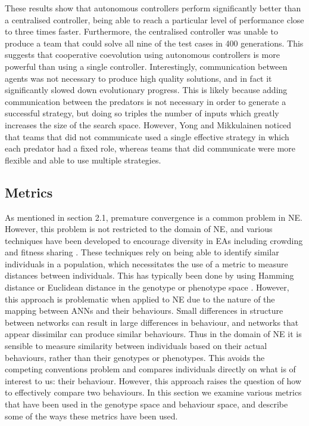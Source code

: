 \documentclass[12pt]{article} %
\begin{document}
These results show that autonomous controllers perform significantly better than a centralised controller, being able to reach a particular level of performance close to three times faster. Furthermore, the centralised controller was unable to produce a team that could solve all nine of the test cases in 400 generations. This suggests that cooperative coevolution using autonomous controllers is more powerful than using a single controller. Interestingly, communication between agents was not necessary to produce high quality solutions, and in fact it significantly slowed down evolutionary progress. This is likely because adding communication between the predators is not necessary in order to generate a successful strategy, but doing so triples the number of inputs which greatly increases the size of the search space. However, Yong and Mikkulainen noticed that teams that did not communicate used a single effective strategy in which each predator had a fixed role, whereas teams that did communicate were more flexible and able to use multiple strategies.

\subsection{Metrics}

As mentioned in section 2.1, premature convergence is a common problem in NE. However, this problem is not restricted to the domain of NE, and various techniques have been developed to encourage diversity in EAs including crowding \cite{Goldberg1987}\cite{Sareni1998} and fitness sharing \cite{Goldberg1987}\cite{Sareni1998}. These techniques rely on being able to identify similar individuals in a population, which necessitates the use of a metric to measure distances between individuals. This has typically been done by using Hamming distance or Euclidean distance in the genotype or phenotype space \cite{Gomez2009}. However, this approach is problematic when applied to NE due to the nature of the mapping between ANNs and their behaviours. Small differences in structure between networks can result in large differences in behaviour, and networks that appear dissimilar can produce similar behaviours. Thus in the domain of NE it is sensible to measure similarity between individuals based on their actual behaviours, rather than their genotypes or phenotypes. This avoids the competing conventions problem and compares individuals directly on what is of interest to us: their behaviour. However, this approach raises the question of how to effectively compare two behaviours. In this section we examine various metrics that have been used in the genotype space and behaviour space, and describe some of the ways these metrics have been used.
\end{document}
